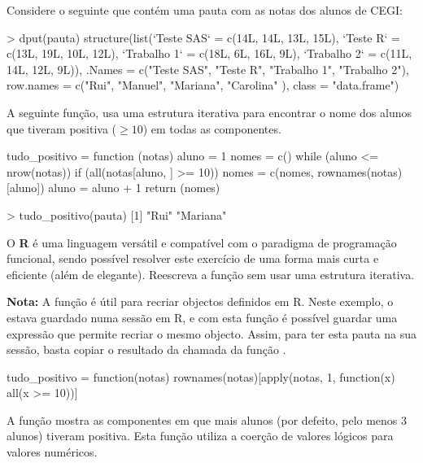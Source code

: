\documentclass{exam}
\begin{document}
\begin{questions}
\question  Considere o seguinte  que contém uma pauta com as notas dos alunos de CEGI:

\begin{rcode}
	> dput(pauta)
	structure(list(`Teste SAS` = c(14L, 14L, 13L, 15L), `Teste R` = c(13L,
	19L, 10L, 12L), `Trabalho 1` = c(18L, 6L, 16L, 9L), `Trabalho 2` = c(11L,
	14L, 12L, 9L)), .Names = c("Teste SAS", "Teste R", "Trabalho 1",
	"Trabalho 2"), row.names = c("Rui", "Manuel", "Mariana", "Carolina"
	), class = "data.frame")
\end{rcode}

A seguinte função, usa uma estrutura iterativa para encontrar o nome dos alunos que tiveram positiva ($\geq 10$) em todas as componentes.

\begin{rcode}
tudo_positivo = function (notas) {
	aluno = 1
	nomes = c()
	while (aluno <= nrow(notas)) {
		if (all(notas[aluno, ] >= 10)) {
			nomes = c(nomes, rownames(notas)[aluno])
		}
		aluno = aluno + 1
	}
	return (nomes)
}

> tudo_positivo(pauta)
[1] "Rui"     "Mariana"
\end{rcode}

O \textbf{R} é uma linguagem versátil e compatível com o paradigma de programação funcional, sendo possível resolver este exercício de uma forma mais curta e eficiente (além de elegante). Reescreva a função  sem usar uma estrutura iterativa.

{\small \textbf{Nota:} A função  é útil para recriar objectos definidos em R. Neste exemplo, o  estava guardado numa sessão em R, e com esta função é possível guardar uma expressão que permite recriar o mesmo objecto. Assim, para ter esta pauta na sua sessão, basta copiar o resultado da chamada da função }.

\begin{solution}
\begin{rcode}
tudo_positivo = function(notas) {
	rownames(notas)[apply(notas, 1, function(x) all(x >= 10))]
}
\end{rcode}
\end{solution}

\question A função  mostra as componentes em que mais alunos (por defeito, pelo menos 3 alunos) tiveram positiva. Esta função utiliza a coerção de valores lógicos para valores numéricos.


\end{questions}
\end{document}
